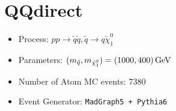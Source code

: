 \documentclass[12pt]{article}
\begin{document}
\section{QQdirect }

\begin{itemize}
\item  Process:  $pp \to \tilde q \tilde q, \tilde q \to q \tilde \chi_1^0$

\item  Parameters:  $(m_{\tilde q}, m_{\tilde \chi_1^0}) = (1000, 400) \,{\rm GeV}$

\item  Number of Atom MC events:  7380

\item  Event Generator: { \tt  MadGraph5 + Pythia6
 }
\end{itemize}
\end{document}
